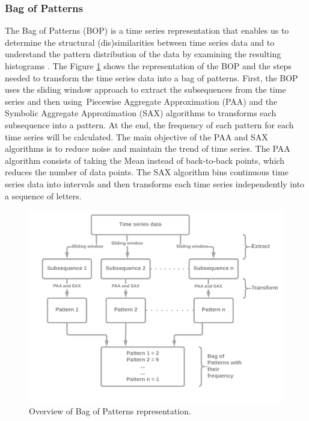 \subsubsection*{Bag of Patterns}

The Bag of Patterns (BOP) is a time series representation that enables us to determine the structural (dis)similarities between time series data and to understand the pattern distribution of the data by examining the resulting histograms \cite{Lin2012RotationinvariantSI}. The Figure \ref{fig:OverviewBOPRepresentation} shows the representation of the BOP and the steps needed to transform the time series data into a bag of patterns. First, the BOP uses the sliding window approach to extract the subsequences from the time series and then using Piecewise Aggregate Approximation (PAA) and the Symbolic Aggregate Approximation (SAX) algorithms to transforms each subsequence into a pattern. At the end, the frequency of each pattern for each time series will be calculated. The main objective of the PAA and SAX algorithms is to reduce noise and maintain the trend of time series. The PAA algorithm consists of taking the Mean instead of back-to-back points, which reduces the number of data points. The SAX algorithm bins continuous time series data into intervals and then transforms each time series independently into a sequence of letters.

\begin{figure}[ht]
	\centering
	\includegraphics[width=\textwidth]{gfx/Overview of Bag of Patterns representation.PNG}
	\captionsetup{justification=centering}
	\caption{Overview of Bag of Patterns representation.}
	\label{fig:OverviewBOPRepresentation}
\end{figure}

